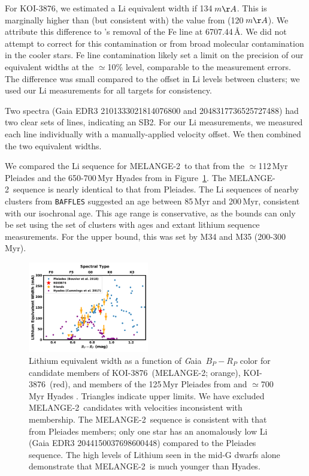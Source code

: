\documentclass[twocolumn]{aastex631}
\newcommand{\starname}{KOI-3876}
\newcommand{\gaia}{{\textit Gaia}}
\newcommand{\association}{MELANGE-2}
\begin{document}
For \starname, we estimated a Li equivalent width if 134\,$m\AA$. This is marginally higher than (but consistent with) the value from \citet{2018ApJ...855..115B} (120\,$m\AA$). We attribute this difference to \citet{2018ApJ...855..115B}'s removal of the Fe line at 6707.44\,\AA. We did not attempt to correct for this contamination or from broad molecular contamination in the cooler stars. Fe line contamination likely set a limit on the precision of our equivalent widths at the $\simeq$10\% level, comparable to the measurement errors. The difference was small compared to the offset in Li levels between clusters; we used our Li measurements for all targets for consistency.

Two spectra (Gaia EDR3 2101333021814076800 and 2048317736525727488) had two clear sets of lines, indicating an SB2. For our Li measurements, we measured each line individually with a manually-applied velocity offset. We then combined the two equivalent widths. 

We compared the Li sequence for \association\ to that from the $\simeq$112\,Myr Pleiades \citet{2018A&A...613A..63B} and the 650-700\,Myr Hyades from \citep{2017AJ....153..128C} in Figure~\ref{fig:lithium}. The \association\ sequence is nearly identical to that from Pleiades. The Li sequences of nearby clusters from \texttt{BAFFLES} \citep{BAFFLES2020} suggested an age between 85\,Myr and 200\,Myr, consistent with our isochronal age. This age range is conservative, as the bounds can only be set using the set of clusters with ages and extant lithium sequence measurements. For the upper bound, this was set by M34 and M35 (200-300\,Myr).

\begin{figure}[tbh]
    \centering
    \includegraphics[width=0.47\textwidth]{lithium.pdf}
    \caption{Lithium equivalent width as a function of \gaia\ $B_P-R_P$ color for candidate members of \starname\ (\association; orange), \starname\ (red), and members of the 125\,Myr Pleiades from \citet{2018A&A...613A..63B} and $\simeq$700\,Myr Hyades \citep{2017AJ....153..128C}. Triangles indicate upper limits. We have excluded \association\ candidates with velocities inconsistent with membership. The \association\ sequence is consistent with that from Pleiades members; only one star has an anomalously low Li (Gaia EDR3 2044150037698600448) compared to the Pleiades sequence. The high levels of Lithium seen in the mid-G dwarfs alone demonstrate that \association\ is much younger than Hyades. 
    \label{fig:lithium}
    }
\end{figure} 
\end{document}
